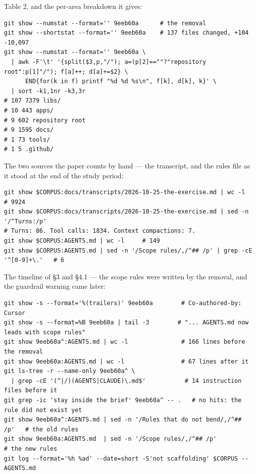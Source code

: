 \documentclass[11pt,a4paper]{article}
\begin{document}
Table 2, and the per-area breakdown it gives:

\begin{Verbatim}[fontsize=\footnotesize,breaklines=true,breakanywhere=true]
git show --numstat --format='' 9eeb60a      # the removal
git show --shortstat --format='' 9eeb60a    # 137 files changed, +104 -10,097
git show --numstat --format='' 9eeb60a \
  | awk -F'\t' '{split($3,p,"/"); a=(p[2]==""?"repository root":p[1]"/"); f[a]++; d[a]+=$2} \
      END{for(k in f) printf "%d %d %s\n", f[k], d[k], k}' \
  | sort -k1,1nr -k3,3r
# 107 7379 libs/
# 10 443 apps/
# 9 602 repository root
# 9 1595 docs/
# 1 73 tools/
# 1 5 .github/
\end{Verbatim}

The two sources the paper counts by hand --- the transcript, and the rules file as it stood at the end of the study period:

\begin{Verbatim}[fontsize=\footnotesize,breaklines=true,breakanywhere=true]
git show $CORPUS:docs/transcripts/2026-10-25-the-exercise.md | wc -l   # 9924
git show $CORPUS:docs/transcripts/2026-10-25-the-exercise.md | sed -n '/^Turns:/p'
# Turns: 86. Tool calls: 1834. Context compactions: 7.
git show $CORPUS:AGENTS.md | wc -l     # 149
git show $CORPUS:AGENTS.md | sed -n '/Scope rules/,/^## /p' | grep -cE '^[0-9]+\.'   # 6
\end{Verbatim}

The timeline of \S{}3 and \S{}4.1 --- the scope rules were written by the removal, and the guardrail warning came later:

\begin{Verbatim}[fontsize=\footnotesize,breaklines=true,breakanywhere=true]
git show -s --format='%(trailers)' 9eeb60a        # Co-authored-by: Cursor
git show -s --format=%B 9eeb60a | tail -3        # "... AGENTS.md now leads with scope rules"
git show 9eeb60a^:AGENTS.md | wc -l               # 166 lines before the removal
git show 9eeb60a:AGENTS.md | wc -l                # 67 lines after it
git ls-tree -r --name-only 9eeb60a^ \
  | grep -cE '(^|/)(AGENTS|CLAUDE)\.md$'           # 14 instruction files before it
git grep -ic 'stay inside the brief' 9eeb60a^ -- .   # no hits: the rule did not exist yet
git show 9eeb60a^:AGENTS.md | sed -n '/Rules that do not bend/,/^## /p'   # the old rules
git show 9eeb60a:AGENTS.md  | sed -n '/Scope rules/,/^## /p'             # the new rules
git log --format='%h %ad' --date=short -S'not scaffolding' $CORPUS -- AGENTS.md
\end{Verbatim}
\end{document}
